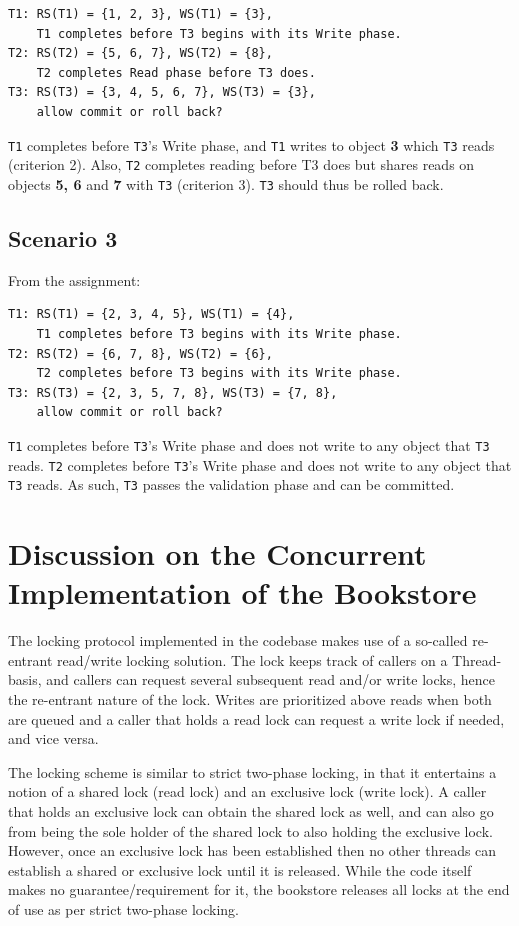 \begin{verbatim}
T1: RS(T1) = {1, 2, 3}, WS(T1) = {3},
    T1 completes before T3 begins with its Write phase.
T2: RS(T2) = {5, 6, 7}, WS(T2) = {8},
    T2 completes Read phase before T3 does.
T3: RS(T3) = {3, 4, 5, 6, 7}, WS(T3) = {3},
    allow commit or roll back?
\end{verbatim}

\texttt{T1} completes before \texttt{T3}'s Write phase, and \texttt{T1} writes
to object \textbf{3} which \texttt{T3} reads (criterion 2). Also, \texttt{T2}
completes reading before T3 does but shares reads on objects \textbf{5, 6} and
\textbf{7} with \texttt{T3} (criterion 3). \texttt{T3} should thus be rolled
back.

\subsection{Scenario 3}
From the assignment:

\begin{verbatim}
T1: RS(T1) = {2, 3, 4, 5}, WS(T1) = {4},
    T1 completes before T3 begins with its Write phase.
T2: RS(T2) = {6, 7, 8}, WS(T2) = {6},
    T2 completes before T3 begins with its Write phase.
T3: RS(T3) = {2, 3, 5, 7, 8}, WS(T3) = {7, 8},
    allow commit or roll back?
\end{verbatim}

\texttt{T1} completes before \texttt{T3}'s Write phase and does not write to any
object that \texttt{T3} reads. \texttt{T2} completes before \texttt{T3}'s Write
phase and does not write to any object that \texttt{T3} reads. As such,
\texttt{T3} passes the validation phase and can be committed.

\section{Discussion on the Concurrent Implementation of the Bookstore}
The locking protocol implemented in the codebase makes use of a so-called
re-entrant read/write locking solution. The lock keeps track of callers on a
Thread-basis, and callers can request several subsequent read and/or write
locks, hence the re-entrant nature of the lock. Writes are prioritized above
reads when both are queued and a caller that holds a read lock can request a
write lock if needed, and vice versa.

The locking scheme is similar to strict two-phase locking, in that it entertains
a notion of a shared lock (read lock) and an exclusive lock (write lock). A
caller that holds an exclusive lock can obtain the shared lock as well, and can
also go from being the sole holder of the shared lock to also holding the
exclusive lock. However, once an exclusive lock has been established then no
other threads can establish a shared or exclusive lock until it is released.
While the code itself makes no guarantee/requirement for it, the bookstore
releases all locks at the end of use as per strict two-phase locking.

